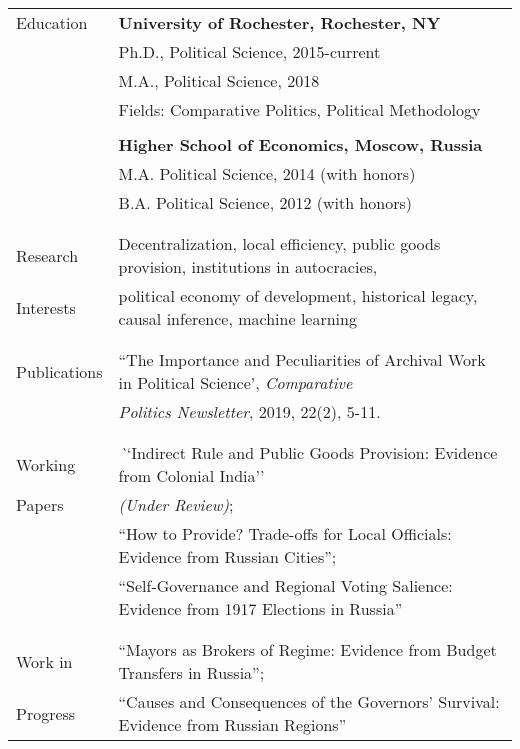 \documentclass[letterpaper,11pt,oneside]{article}
\begin{document}
\noindent \begin{tabular}{@{} l l}
 \Large{Education}    & \textbf{University of Rochester, Rochester, NY} \\
     & Ph.D., Political Science, 2015-current \\
     & M.A., Political Science, 2018 \\
     & Fields: Comparative Politics, Political Methodology \\
     \vspace*{-2mm}
     & \\
     & \textbf{Higher School of Economics, Moscow, Russia} \\
     & M.A. Political Science, 2014 (with honors) \\
     & B.A. Political Science, 2012 (with honors) \\
     & \\
&\\
\Large{Research} & Decentralization, local efficiency, public goods provision,  institutions in autocracies,  \\
\Large{Interests} &political economy of development, historical legacy, causal inference, machine learning\\
 & \\
&\\
\Large{Publications}
& ``The Importance and Peculiarities of Archival Work in Political Science', \textit{Comparative} \\
& \textit{Politics Newsletter}, 2019, 22(2), 5-11.\\
& \\
&\\
\Large{Working}
 & \textit``Indirect Rule and Public Goods Provision: Evidence from Colonial  India''\\
 \Large{Papers}& \textit{(Under Review)};\\
 & ``How to Provide? Trade-offs for Local Officials: Evidence from Russian Cities'';\\
 &   ``Self-Governance and Regional Voting Salience: Evidence from 1917 Elections in Russia''\\
  & \\
 &\\
 \Large{Work in}
 &``Mayors as Brokers of Regime: Evidence from Budget Transfers in Russia'';\\
  \Large{Progress} &``Causes and Consequences of the Governors' Survival: Evidence from Russian Regions''\\

\end{tabular}
\end{document}
